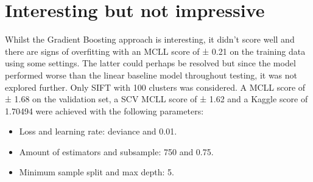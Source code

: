 
\section{Interesting but not impressive}
\label{section:gb_optimal}

Whilst the Gradient Boosting approach is interesting, it didn't score well and there are signs of overfitting with an MCLL score of ± 0.21 on the training data using some settings.
The latter could perhaps be resolved but since the model performed worse than the linear baseline model throughout testing, it was not explored further.
Only SIFT with 100 clusters was considered.
A MCLL score of ± 1.68 on the validation set, a SCV MCLL score of ± 1.62 and a Kaggle score of 1.70494 were achieved with the following parameters:
\begin{itemize}
    \item Loss and learning rate: deviance and 0.01.
    \item Amount of estimators and subsample: 750 and 0.75.
    \item Minimum sample split and max depth: 5.
\end{itemize}